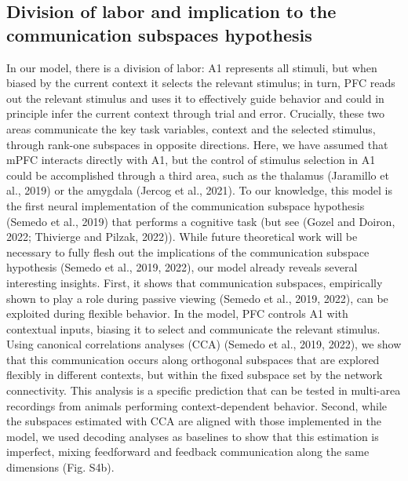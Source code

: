 \documentclass[12pt]{article}
\begin{document}
\subsection*{Division of labor and implication to the communication subspaces hypothesis}
In our model, there is a division of labor: A1 represents all stimuli, but when biased by the current context it selects the relevant stimulus; in turn, PFC reads out the relevant stimulus and uses it to effectively guide behavior and could in principle infer the current context through trial and error. Crucially, these two areas communicate the key task variables, context and the selected stimulus, through rank-one subspaces in opposite directions. Here, we have assumed that mPFC interacts directly with A1, but the control of stimulus selection in A1 could be accomplished through a third area, such as the thalamus (Jaramillo et al., 2019) or the amygdala (Jercog et al., 2021). To our knowledge, this model is the first neural implementation of the communication subspace hypothesis (Semedo et al., 2019) that performs a cognitive task (but see (Gozel and Doiron, 2022; Thivierge and Pilzak, 2022)). While future theoretical work will be necessary to fully flesh out the implications of the communication subspace hypothesis (Semedo et al., 2019, 2022), our model already reveals several interesting insights. First, it shows that communication subspaces, empirically shown to play a role during passive viewing (Semedo et al., 2019, 2022), can be exploited during flexible behavior. In the model, PFC controls A1 with contextual inputs, biasing it to select and communicate the relevant stimulus. Using canonical correlations analyses (CCA) (Semedo et al., 2019, 2022), we show that this communication occurs along orthogonal subspaces that are explored flexibly in different contexts, but within the fixed subspace set by the network connectivity. This analysis is a specific prediction that can be tested in multi-area recordings from animals performing context-dependent behavior. Second, while the subspaces estimated with CCA are aligned with those implemented in the model, we used decoding analyses as baselines to show that this estimation is imperfect, mixing feedforward and feedback communication along the same dimensions (Fig. S4b).  
\end{document}
